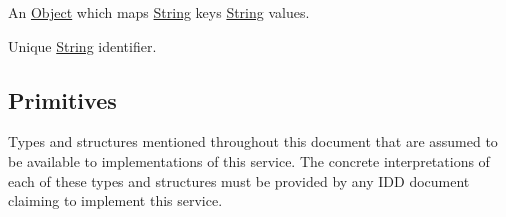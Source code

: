 \documentclass[a4paper]{arrowhead}
\newcommand{\pref}[1]{{\textcolor{ArrowheadGrey}{\hyperref[sec:model:primitives:#1]{#1}}}}
\begin{document}

An \pref{Object} which maps \pref{String} keys \pref{String} values.


Unique \pref{String} identifier. 

\subsection{Primitives}
\label{sec:model:primitives}

Types and structures mentioned throughout this document that are assumed to be available to implementations of this service.
The concrete interpretations of each of these types and structures must be provided by any IDD document claiming to implement this service.
\end{document}
